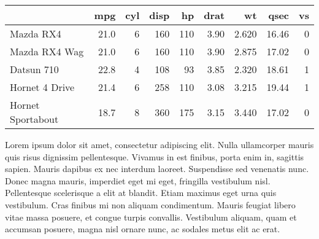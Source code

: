 \documentclass[]{article}
\newenvironment{Shaded}{\begin{snugshade}}{\end{snugshade}}
\newcommand{\KeywordTok}[1]{\textcolor[rgb]{0.13,0.29,0.53}{\textbf{{#1}}}}
\newcommand{\DataTypeTok}[1]{\textcolor[rgb]{0.13,0.29,0.53}{{#1}}}
\newcommand{\DecValTok}[1]{\textcolor[rgb]{0.00,0.00,0.81}{{#1}}}
\newcommand{\StringTok}[1]{\textcolor[rgb]{0.31,0.60,0.02}{{#1}}}
\newcommand{\NormalTok}[1]{{#1}}
\begin{document}
\begingroup\fontsize{6}{8}\selectfont

\begin{longtable}[l]{l|r|r|r|r|r|r|r|r}
\hline
  & mpg & cyl & disp & hp & drat & wt & qsec & vs\\
\hline
Mazda RX4 & 21.0 & 6 & 160 & 110 & 3.90 & 2.620 & 16.46 & 0\\
\hline
Mazda RX4 Wag & 21.0 & 6 & 160 & 110 & 3.90 & 2.875 & 17.02 & 0\\
\hline
Datsun 710 & 22.8 & 4 & 108 & 93 & 3.85 & 2.320 & 18.61 & 1\\
\hline
Hornet 4 Drive & 21.4 & 6 & 258 & 110 & 3.08 & 3.215 & 19.44 & 1\\
\hline
Hornet Sportabout & 18.7 & 8 & 360 & 175 & 3.15 & 3.440 & 17.02 & 0\\
\hline
\end{longtable}

\endgroup

Lorem ipsum dolor sit amet, consectetur adipiscing elit. Nulla
ullamcorper mauris quis risus dignissim pellentesque. Vivamus in est
finibus, porta enim in, sagittis sapien. Mauris dapibus ex nec interdum
laoreet. Suspendisse sed venenatis nunc. Donec magna mauris, imperdiet
eget mi eget, fringilla vestibulum nisl. Pellentesque scelerisque a elit
at blandit. Etiam maximus eget urna quis vestibulum. Cras finibus mi non
aliquam condimentum. Mauris feugiat libero vitae massa posuere, et
congue turpis convallis. Vestibulum aliquam, quam et accumsan posuere,
magna nisl ornare nunc, ac sodales metus elit ac erat.

\begin{Shaded}
\end{Shaded}

\end{document}
